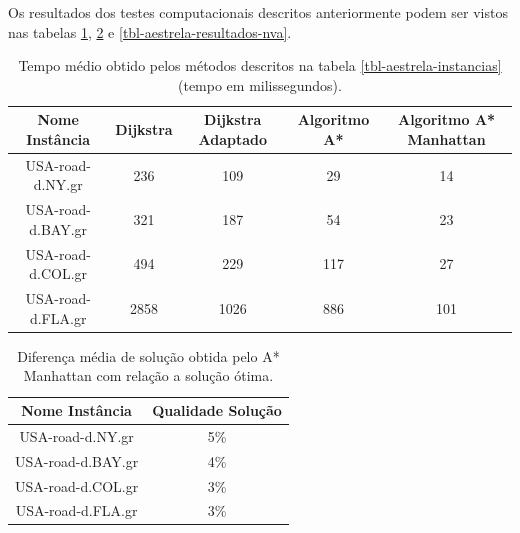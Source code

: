 Os resultados dos testes computacionais descritos anteriormente podem ser vistos nas tabelas \ref{tbl-aestrela-resultados-tempo}, \ref{tbl-aestrela-resultados-qualidadesolucao} e \ref{tbl-aestrela-resultados-nva}.

\begin{table}[H]
\caption{Tempo médio obtido pelos métodos descritos na tabela \ref{tbl-aestrela-instancias} (tempo em milissegundos).}
\label{tbl-aestrela-resultados-tempo}
\centering
\begin{adjustbox}{max width=\textwidth}
\begin{tabular}{|c|c|c|c|c|}
\hline
\textbf{Nome Instância} & \textbf{Dijkstra} & \textbf{Dijkstra Adaptado} & \textbf{Algoritmo A*} & \textbf{Algoritmo A* Manhattan} \\ \hline
USA-road-d.NY.gr        & 236                           & 109                                    & 29                      & 14                                \\ \hline
USA-road-d.BAY.gr       & 321                           & 187                                    & 54                      & 23                                \\ \hline
USA-road-d.COL.gr       & 494                           & 229                                    & 117                     & 27                                \\ \hline
USA-road-d.FLA.gr       & 2858                          & 1026                                   & 886                     & 101                               \\ \hline
\end{tabular} 
\end{adjustbox}
\end{table}

\begin{table}[H]
\caption{Diferença média de solução obtida pelo A* Manhattan com relação a solução ótima.}
\label{tbl-aestrela-resultados-qualidadesolucao}
\centering
\begin{adjustbox}{max width=\textwidth}
\begin{tabular}{|c|c|}
\hline
\textbf{Nome Instância} & \textbf{Qualidade Solução} \\ \hline
USA-road-d.NY.gr        & 5\%                        \\ \hline
USA-road-d.BAY.gr       & 4\%                        \\ \hline
USA-road-d.COL.gr       & 3\%                        \\ \hline
USA-road-d.FLA.gr       & 3\%                        \\ \hline
\end{tabular} 
\end{adjustbox}
\end{table}

